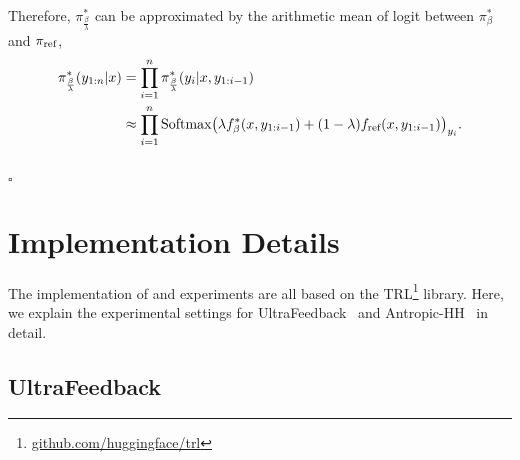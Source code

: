 Therefore, $\pi^*_\frac{\beta}{\lambda}$ can be approximated by the arithmetic mean of logit between $\pi^*_\beta$ and $\pi_{\textnormal{ref}}$,
\begin{equation*}
\begin{split}
\pi^*_{\frac{\beta}{\lambda}} (y_{1:n}|x) &= \prod_{i=1}^n \pi^*_{\frac{\beta}{\lambda}} (y_i|x, y_{1:i-1}) \\
&\approx \prod_{i=1}^n \textnormal{Softmax} \big(\lambda f^*_\beta (x, y_{1:i-1}) + (1 - \lambda) f_{\textnormal{ref}} (x, y_{1:i-1}) \big)_{y_i}.\\
 \\
\end{split}
\end{equation*}
\hfill $\square$

\section{Implementation Details}
\label{app:implementation_details}

The implementation of \method{} and experiments are all based on the TRL\footnote{\href{https://github.com/huggingface/trl}{github.com/huggingface/trl}} library. Here, we explain the experimental settings for UltraFeedback~\cite{cui2023ultrafeedback} and Antropic-HH~\cite{bai2022training} in detail.

\subsection{UltraFeedback}

